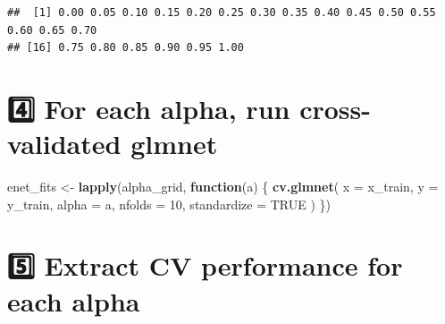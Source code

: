 \documentclass[
]{article}
\newenvironment{Shaded}{\begin{snugshade}}{\end{snugshade}}
\newcommand{\AttributeTok}[1]{\textcolor[rgb]{0.13,0.29,0.53}{#1}}
\newcommand{\ConstantTok}[1]{\textcolor[rgb]{0.56,0.35,0.01}{#1}}
\newcommand{\ControlFlowTok}[1]{\textcolor[rgb]{0.13,0.29,0.53}{\textbf{#1}}}
\newcommand{\DecValTok}[1]{\textcolor[rgb]{0.00,0.00,0.81}{#1}}
\newcommand{\FloatTok}[1]{\textcolor[rgb]{0.00,0.00,0.81}{#1}}
\newcommand{\FunctionTok}[1]{\textcolor[rgb]{0.13,0.29,0.53}{\textbf{#1}}}
\newcommand{\NormalTok}[1]{#1}
\newcommand{\OtherTok}[1]{\textcolor[rgb]{0.56,0.35,0.01}{#1}}
\newcommand{\SpecialCharTok}[1]{\textcolor[rgb]{0.81,0.36,0.00}{\textbf{#1}}}
\begin{document}
\begin{verbatim}
##  [1] 0.00 0.05 0.10 0.15 0.20 0.25 0.30 0.35 0.40 0.45 0.50 0.55 0.60 0.65 0.70
## [16] 0.75 0.80 0.85 0.90 0.95 1.00
\end{verbatim}

\section{4️⃣ For each alpha, run cross-validated
glmnet}\label{for-each-alpha-run-cross-validated-glmnet}

\begin{Shaded}
\begin{Highlighting}[]
\NormalTok{enet\_fits }\OtherTok{\textless{}{-}} \FunctionTok{lapply}\NormalTok{(alpha\_grid, }\ControlFlowTok{function}\NormalTok{(a) \{}
  \FunctionTok{cv.glmnet}\NormalTok{(}
    \AttributeTok{x =}\NormalTok{ x\_train,}
    \AttributeTok{y =}\NormalTok{ y\_train,}
    \AttributeTok{alpha =}\NormalTok{ a,}
    \AttributeTok{nfolds =} \DecValTok{10}\NormalTok{,}
    \AttributeTok{standardize =} \ConstantTok{TRUE}
\NormalTok{  )}
\NormalTok{\})}
\end{Highlighting}
\end{Shaded}

\section{5️⃣ Extract CV performance for each
alpha}\label{extract-cv-performance-for-each-alpha}

\begin{Shaded}
\end{Shaded}
\end{document}
